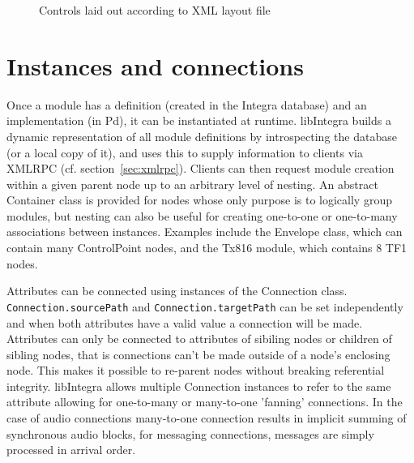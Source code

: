 \documentclass[twoside,10pt,a4paper]{article}
\begin{document}
\begin{figure}[htbp]
\centerline{}
\caption{Controls laid out according to XML layout file}
\label{fig:control_layout}
\end{figure}

\section{Instances and connections}

Once a module has a definition (created in the Integra database) and an implementation (in Pd), it can be instantiated at runtime. libIntegra builds a dynamic representation of all module definitions by introspecting the database (or a local copy of it), and uses this to supply information to clients via XMLRPC (cf. section~\ref{sec:xmlrpc}). Clients can then request module creation within a given parent node up to an arbitrary level of nesting. An abstract Container class is provided for nodes whose only purpose is to logically group modules, but nesting can also be useful for creating one-to-one or one-to-many associations between instances. Examples include the Envelope class, which can contain many ControlPoint nodes, and the Tx816 module, which contains 8 TF1 nodes.

Attributes can be connected using instances of the Connection class. \verb!Connection.sourcePath! and \linebreak\verb!Connection.targetPath! can be set independently and when both attributes have a valid value a connection will be made. Attributes can only be connected to attributes of sibiling nodes or children of sibling nodes, that is connections can't be made outside of a node's enclosing node. This makes it possible to re-parent nodes without breaking referential integrity. libIntegra allows multiple Connection instances to refer to the same attribute allowing for one-to-many or many-to-one 'fanning' connections. In the case of audio connections many-to-one connection results in implicit summing of synchronous audio blocks, for messaging connections, messages are simply processed in arrival order.
\end{document}
